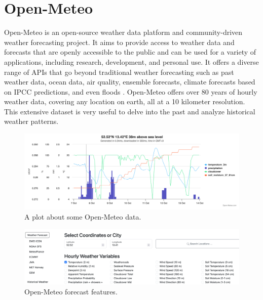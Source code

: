 \section{Open-Meteo} \label{sec:openmeteo}
Open-Meteo is an open-source weather data platform and community-driven weather forecasting project. It aims to provide access to weather data and forecasts that are openly accessible to the public and can be used for a variety of applications, including research, development, and personal use.
It offers a diverse range of APIs that go
beyond traditional weather forecasting such as past weather data, ocean data, air quality, ensemble forecasts, climate forecasts based
on IPCC predictions, and even floods \cite{openmeteo}.
Open-Meteo offers over 80 years of hourly weather data, covering any location on earth, all at a 10 kilometer resolution. This extensive dataset is very useful to delve into the past and analyze historical weather patterns.

\begin{figure}[H]
	\centering
	\includegraphics[width=\linewidth, keepaspectratio]{chapters/1_introduction/imgs/openmeteochart.png}
	\caption{A plot about some Open-Meteo data.}
	\label{fig:openmeteochart}
\end{figure}
\begin{figure}[H]
	\centering
	\includegraphics[width=\linewidth, keepaspectratio]{chapters/1_introduction/imgs/openmeteodata.png}
	\caption{Open-Meteo forecast features.}
	\label{fig:openmeteofetaures}
\end{figure}
